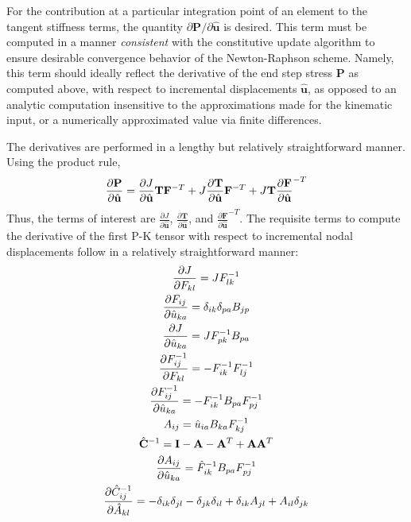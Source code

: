 For the contribution at a particular integration point of an element to the tangent stiffness terms, the quantity $\partial{\bm{P}}/\partial{\hat{\bm{u}}}$ is desired. This term must be computed in a manner \textit{consistent} with the constitutive update algorithm to ensure desirable convergence behavior of the Newton-Raphson scheme. Namely, this term should ideally reflect the derivative of the end step stress $\bm{P}$ as computed above, with respect to incremental displacements $\hat{\bm{u}}$, as opposed to an analytic computation insensitive to the approximations made for the kinematic input, or a numerically approximated value via finite differences.

The derivatives are performed in a lengthy but relatively straightforward manner. Using the product rule,
\begin{equation}
\frac{\partial {\bf P}}{\partial \hat{{\bf u}}} = \frac{\partial J}{\partial \hat{\bf u}}{\bf T}{\bf F}^{-T} + J\frac{\partial {\bf T}}{\partial \hat{\bf u}}{\bf F}^{-T} + J{\bf T}\frac{\partial {\bf F}}{\partial \hat{\bf u}}^{-T}
\end{equation}
Thus, the terms of interest are $\frac{\partial J}{\partial \hat{\mathbf{u}}}$, $\frac{\partial \mathbf{T}}{\partial \hat{\mathbf{u}}}$, and $\frac{\partial \mathbf{F}}{\partial \hat{\mathbf{u}}}^{-T}$. The requisite terms to compute the derivative of the first P-K tensor with respect to incremental nodal displacements follow in a relatively straightforward manner:
\begin{gather}
\frac{\partial J}{\partial F_{kl}} = JF_{lk}^{{-1}} \\
\frac{\partial F_{ij}}{\partial \hat{u}_{ka}} = \delta_{ik}\delta_{pa}B_{jp} \\
\frac{\partial J}{\partial \hat{u}_{ka}} = JF_{pk}^{-1}B_{pa} \\
\frac{\partial F_{ij}^{-1}}{\partial F_{kl}} = - F_{ik}^{-1}F_{lj}^{-1} \\
\frac{\partial F_{ij}^{-1}}{\partial \hat{u}_{ka}} = - F_{ik}^{-1}B_{pa}F_{pj}^{-1} \\
A_{ij} = \hat{u}_{ia}B_{ka}F^{-1}_{kj} \\
\hat{{\bf C}}^{-1} = {\bf I} - {\bf A} - {\bf A}^T + {\bf A}{\bf A}^T \\
\frac{\partial A_{ij}}{\partial \hat{u}_{ka}} = \hat{F}^{-1}_{ik}B_{pa}F^{-1}_{pj} \\
\frac{\partial \hat{C}^{-1}_{ij}}{\partial \hat{A}_{kl}} = -\delta_{ik}\delta_{jl} - \delta_{jk}\delta_{il} + \delta_{ik}A_{jl} + A_{il}\delta_{jk}
\end{gather}
